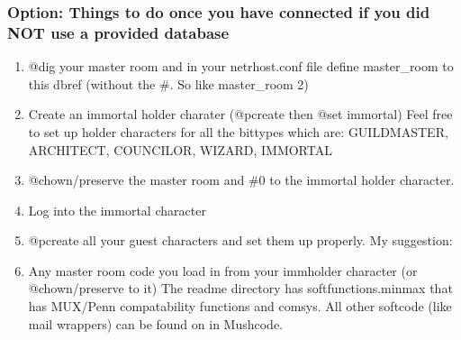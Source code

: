 \documentclass[letterpaper,10pt,english]{sphinxmanual}
\begin{document}
\subsubsection{Option: Things to do once you have connected if you did NOT use a provided database}
\label{\detokenize{installation:option-things-to-do-once-you-have-connected-if-you-did-not-use-a-provided-database}}\begin{enumerate}
%
\item {} 
\sphinxAtStartPar
@dig your master room and in your netrhost.conf file define master\_room to this dbref (without the \#.  So like master\_room 2)

\item {} 
\sphinxAtStartPar
Create an immortal holder charater (@pcreate then @set immortal) Feel free to set up holder characters for all the bittypes which are: GUILDMASTER, ARCHITECT, COUNCILOR, WIZARD, IMMORTAL

\item {} 
\sphinxAtStartPar
@chown/preserve the master room and \#0 to the immortal holder character.

\item {} 
\sphinxAtStartPar
Log into the immortal character

\item {} 
\sphinxAtStartPar
@pcreate all your guest characters and set them up properly.  My suggestion:

\begin{sphinxVerbatim}[commandchars=\\\{\}]
  

         
\end{sphinxVerbatim}

\item {} 
\sphinxAtStartPar
Any master room code you load in from your immholder character (or @chown/preserve to it) The readme directory has softfunctions.minmax that has MUX/Penn compatability functions and comsys.  All other softcode (like mail wrappers) can be found on  in Mushcode.

\end{enumerate}
\end{document}
